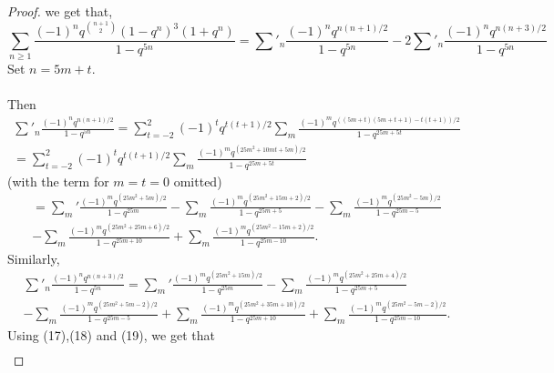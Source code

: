 \documentclass[10pt,reqno]{amsart}
\begin{document}
\begin{proof}
we get that,
\begin{equation}
\displaystyle\sum_{n\geq 1}\displaystyle\frac{(-1)^nq^{\binom{n+1}{2}}(1-q^n)^3(1+q^n)}{1-q^{5n}}=\displaystyle\sum'_{n}\displaystyle\frac{(-1)^nq^{n(n+1)/2}}{1-q^{5n}}-2\displaystyle\sum'_{n}\displaystyle\frac{(-1)^nq^{n(n+3)/2}}{1-q^{5n}}
\end{equation}
Set $n=5m+t.$ \\ \\
Then 
\begin{align*}
    \displaystyle\sum'_{n}\displaystyle\frac{(-1)^nq^{n(n+1)/2}}{1-q^{5n}}=\displaystyle\sum_{t=-2}^{2}(-1)^tq^{t(t+1)/2}\displaystyle\sum_{m}\displaystyle\frac{(-1)^mq^{((5m+t)(5m+t+1)-t(t+1))/2}}{1-q^{25m+5t}} \\
    =\displaystyle\sum_{t=-2}^{2}(-1)^tq^{t(t+1)/2}\displaystyle\sum_{m}\displaystyle\frac{(-1)^mq^{(25m^2+10mt+5m)/2}}{1-q^{25m+5t}} 
\end{align*}
\hspace{6.5cm}(with the term for $m=t=0$ omitted)
\begin{multline}
    =\displaystyle\sum_{m}'\displaystyle\frac{(-1)^mq^{(25m^2+5m)/2}}{1-q^{25m}}-\displaystyle\sum_{m}\displaystyle\frac{(-1)^mq^{(25m^2+15m+2)/2}}{1-q^{25m+5}}-\displaystyle\sum_{m}\displaystyle\frac{(-1)^mq^{(25m^2-5m)/2}}{1-q^{25m-5}}\\-\displaystyle\sum_{m}\displaystyle\frac{(-1)^mq^{(25m^2+25m+6)/2}}{1-q^{25m+10}}+\displaystyle\sum_{m}\displaystyle\frac{(-1)^mq^{(25m^2-15m+2)/2}}{1-q^{25m-10}}.
\end{multline}
Similarly, 
\begin{multline}
    \displaystyle\sum'_{n}\displaystyle\frac{(-1)^nq^{n(n+3)/2}}{1-q^{5n}}=\displaystyle\sum_{m}'\displaystyle\frac{(-1)^mq^{(25m^2+15m)/2}}{1-q^{25m}}-\displaystyle\sum_{m}\displaystyle\frac{(-1)^mq^{(25m^2+25m+4)/2}}{1-q^{25m+5}}\\ -\displaystyle\sum_{m}\displaystyle\frac{(-1)^mq^{(25m^2+5m-2)/2}}{1-q^{25m-5}}+\displaystyle\sum_{m}\displaystyle\frac{(-1)^mq^{(25m^2+35m+10)/2}}{1-q^{25m+10}}+\displaystyle\sum_{m}\displaystyle\frac{(-1)^mq^{(25m^2-5m-2)/2}}{1-q^{25m-10}}.
\end{multline}
Using (17),(18) and (19), we get that 
\begin{multline}

\end{multline}
\end{proof}
\end{document}
